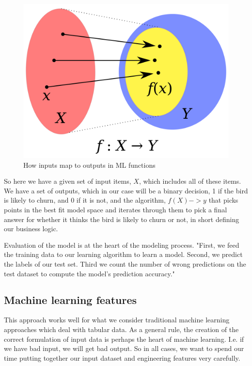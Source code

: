 \documentclass[11pt]{diazessay} %
\begin{document}
\begin{figure}[!ht]
  \includegraphics[width=\linewidth]{figures/function.png}
  \caption{How inputs map to outputs in ML functions \citep{klein2013coding}}
\end{figure}

So here we have a given set of input items, $X$,  which includes all of these items. We have a set of outputs, which in our case will be a binary decision, 1 if the bird is likely to churn, and 0 if it is not, and the algorithm, $f(X) -> y$ that picks points in the best fit model space and iterates through them to pick a final answer for whether it thinks the bird is likely to churn or not, in short defining our business logic. 

Evaluation of the model is at the heart of the modeling process. "First, we feed the training data  to our learning algorithm to learn a model. Second, we predict the labels of our test set. Third we count the number of wrong predictions on the test dataset to compute the model’s prediction  accuracy."\citep{raschka2018model}

\subsection{Machine learning features}
This approach works well for what we consider traditional machine learning approaches which deal with tabular data.  As a general rule, the creation of the correct formulation of input data is perhaps the heart of machine learning. I.e. if we have bad input, we will get bad output. So in all cases, we want to spend our time putting together our input dataset and engineering features very carefully. 
\end{document}
